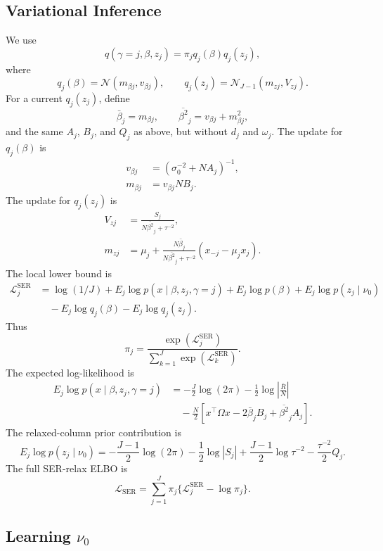 \documentclass[11pt]{article}
\newcommand{\Rbar}{\bar R}
\newcommand{\Om}{\Omega}
\newcommand{\Normal}{\mathcal N}
\begin{document}
\subsection{Variational Inference}

We use
\[
q(\gamma=j,\beta,z_j)=\pi_jq_j(\beta)q_j(z_j),
\]
where
\[
q_j(\beta)=\Normal(m_{\beta j},v_{\beta j}),\qquad
q_j(z_j)=\Normal_{J-1}(m_{zj},V_{zj}).
\]
For a current \(q_j(z_j)\), define
\[
\bar\beta_j=m_{\beta j},\qquad
\overline{\beta^2}_j=v_{\beta j}+m_{\beta j}^2,
\]
and the same \(A_j\), \(B_j\), and \(Q_j\) as above, but without \(d_j\)
and \(\omega_j\). The update for \(q_j(\beta)\) is
\begin{align}
v_{\beta j}
&=
\left(\sigma_0^{-2}+NA_j\right)^{-1},\\
m_{\beta j}
&=
v_{\beta j}NB_j.
\end{align}
The update for \(q_j(z_j)\) is
\begin{align}
V_{zj}
&=
\frac{S_j}{N\overline{\beta^2}_j+\tau^{-2}},\\
m_{zj}
&=
\mu_j+
\frac{N\bar\beta_j}
{N\overline{\beta^2}_j+\tau^{-2}}
(x_{-j}-\mu_jx_j).
\end{align}
The local lower bound is
\begin{align}
\mathcal L_j^{\mathrm{SER}}
&=
\log(1/J)
+E_j\log p(x\mid\beta,z_j,\gamma=j)
+E_j\log p(\beta)
+E_j\log p(z_j\mid\nu_0) \nonumber\\
&\quad
-E_j\log q_j(\beta)
-E_j\log q_j(z_j).
\end{align}
Thus
\[
\pi_j=
\frac{\exp(\mathcal L_j^{\mathrm{SER}})}
{\sum_{k=1}^J\exp(\mathcal L_k^{\mathrm{SER}})}.
\]
The expected log-likelihood is
\begin{align}
E_j\log p(x\mid\beta,z_j,\gamma=j)
&=
-\frac{J}{2}\log(2\pi)
-\frac12\log\left|\frac{\Rbar}{N}\right| \nonumber\\
&\quad
-\frac{N}{2}
\left[
x^\top\Om x
-2\bar\beta_jB_j
+\overline{\beta^2}_jA_j
\right].
\end{align}
The relaxed-column prior contribution is
\[
E_j\log p(z_j\mid\nu_0)
=
-\frac{J-1}{2}\log(2\pi)
-\frac12\log|S_j|
+\frac{J-1}{2}\log\tau^{-2}
-\frac{\tau^{-2}}{2}Q_j.
\]
The full SER-relax ELBO is
\[
\mathcal L_{\mathrm{SER}}
=
\sum_{j=1}^J
\pi_j
\{\mathcal L_j^{\mathrm{SER}}-\log\pi_j\}.
\]

\subsection{\texorpdfstring{Learning \(\nu_0\)}{Learning nu0}}
\end{document}
